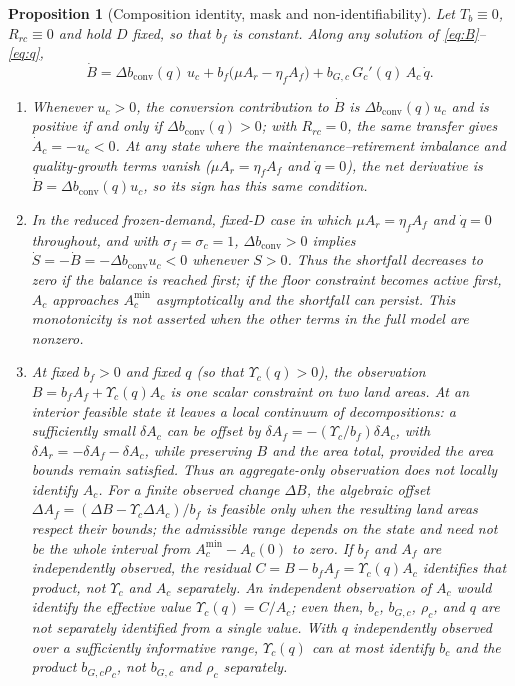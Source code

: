 \documentclass[preprint,12pt,authoryear]{elsarticle}
\newtheorem{proposition}{Proposition}
\newcommand{\dconv}{\Delta b_{\mathrm{conv}}}
\newcommand{\Ups}{\Upsilon_c}
\newcommand{\Acmin}{A_c^{\min}}
\begin{document}
\begin{proposition}[Composition identity, mask and non-identifiability]\label{prop:mask}
Let $T_b\equiv0$, $R_{rc}\equiv0$ and hold $D$ fixed, so that $b_f$ is constant. Along any solution of \eqref{eq:B}--\eqref{eq:q},
\begin{equation}\label{eq:identity}
\dot B=\dconv(q)\,u_c+b_f\big(\mu A_r-\eta_f A_f\big)+b_{G,c}\,G_c'(q)\,A_c\,\dot q .
\end{equation}
\begin{enumerate}[label=(\roman*)]
\item Whenever $u_c>0$, the conversion contribution to $\dot B$ is $\dconv(q)u_c$ and is positive if and only if $\dconv(q)>0$; with $R_{rc}=0$, the same transfer gives $\dot A_c=-u_c<0$. At any state where the maintenance--retirement imbalance and quality-growth terms vanish ($\mu A_r=\eta_f A_f$ and $\dot q=0$), the net derivative is $\dot B=\dconv(q)u_c$, so its sign has this same condition.
\item In the reduced frozen-demand, fixed-$D$ case in which $\mu A_r=\eta_f A_f$ and $\dot q=0$ throughout, and with $\sigma_f=\sigma_c=1$, $\dconv>0$ implies $\dot S=-\dot B=-\dconv u_c<0$ whenever $S>0$. Thus the shortfall decreases to zero if the balance is reached first; if the floor constraint becomes active first, $A_c$ approaches $\Acmin$ asymptotically and the shortfall can persist. This monotonicity is not asserted when the other terms in the full model are nonzero.
\item At fixed $b_f>0$ and fixed $q$ (so that $\Ups(q)>0$), the observation $B=b_fA_f+\Ups(q)A_c$ is one scalar constraint on two land areas. At an interior feasible state it leaves a local continuum of decompositions: a sufficiently small $\delta A_c$ can be offset by $\delta A_f=-(\Ups/b_f)\delta A_c$, with $\delta A_r=-\delta A_f-\delta A_c$, while preserving $B$ and the area total, provided the area bounds remain satisfied. Thus an aggregate-only observation does not locally identify $A_c$. For a finite observed change $\Delta B$, the algebraic offset $\Delta A_f=(\Delta B-\Ups\Delta A_c)/b_f$ is feasible only when the resulting land areas respect their bounds; the admissible range depends on the state and need not be the whole interval from $\Acmin-A_c(0)$ to zero. If $b_f$ and $A_f$ are independently observed, the residual $C=B-b_fA_f=\Ups(q)A_c$ identifies that product, not $\Ups$ and $A_c$ separately. An independent observation of $A_c$ would identify the effective value $\Ups(q)=C/A_c$; even then, $b_c$, $b_{G,c}$, $\rho_c$, and $q$ are not separately identified from a single value. With $q$ independently observed over a sufficiently informative range, $\Ups(q)$ can at most identify $b_c$ and the product $b_{G,c}\rho_c$, not $b_{G,c}$ and $\rho_c$ separately.
\end{enumerate}
\end{proposition}
\end{document}
